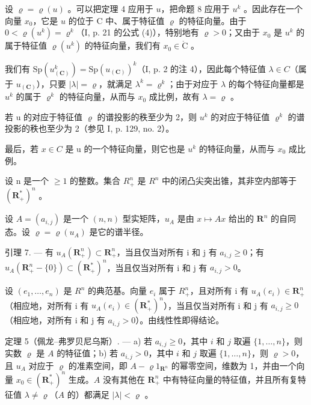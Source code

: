 设 \(\varrho = \varrho(u)\) 。可以把定理 4 应用于 \(u\)，把命题 8 应用于 \(u^k\) 。因此存在一个向量 \(x_0\)，它是 \(u\) 的位于 C 中、属于特征值 \(\varrho\) 的特征向量。由于 \(0 < \varrho(u^k) = \varrho^k\)（I, p. 21 的公式 (4)），特别地有 \(\varrho > 0\)；又由于 \(x_0\) 是 \(u^k\) 的属于特征值 \(\varrho(u^k)\) 的特征向量，我们有 \(x_0 \in \mathring{\mathrm{C}}\) 。

我们有 \(\mathrm{Sp}(u_{(\mathbf{C})}^{k})=\mathrm{Sp}(u_{(\mathbf{C})})^{k}\)（I, p. 2 的注 4），因此每个特征值 \(\lambda\in C\)（属于 \(u_{(\mathbf{C})}\)），只要 \(|\lambda|=\varrho\)，就满足 \(\lambda^{k}=\varrho^{k}\)；由于对应于 \(\lambda\) 的每个特征向量都是 \(u^{k}\) 的属于 \(\varrho^{k}\) 的特征向量，从而与 \(x_{0}\) 成比例，故有 \(\lambda=\varrho\) 。

若 u 的对应于特征值 \(\varrho\) 的谱投影的秩至少为 2，则 \(u^{k}\) 的对应于特征值 \(\varrho^{k}\) 的谱投影的秩也至少为 2（参见 I, p. 129, no. 2）。

最后，若 \(x \in C\) 是 u 的一个特征向量，则它也是 \(u^{k}\) 的特征向量，从而与 \(x_{0}\) 成比例。

设 n 是一个 \(\geqslant 1\) 的整数。集合 \(R_{+}^{n}\) 是 \(R^{n}\) 中的闭凸尖突出锥，其非空内部等于 \((\mathbf{R}_{+}^{*})^{n}\) 。

设 \(A = (a_{i,j})\) 是一个 \((n,n)\) 型实矩阵，\(u_A\) 是由 \(x \mapsto Ax\) 给出的 \(\mathbf{R}^n\) 的自同态。设 \(\varrho = \varrho(u_A)\) 是它的谱半径。

引理 7. --- 有 \(u_A(\mathbf{R}_+^n) \subset \mathbf{R}_+^n\)，当且仅当对所有 i 和 j 有 \(a_{i,j} \geqslant 0\)；有 \(u_A(\mathbf{R}_+^n - \{0\}) \subset (\mathbf{R}_+^*)^n\)，当且仅当对所有 i 和 j 有 \(a_{i,j} > 0\)。

设 \((e_{1},\ldots,e_{n})\) 是 \(R^{n}\) 的典范基。向量 \(e_{i}\) 属于 \(R_{+}^{n}\)，且对所有 i 有 \(u_{A}(e_{i})\in\mathbf{R}_{+}^{n}\)（相应地，对所有 i 有 \(u_{A}(e_{i})\in(\mathbf{R}_{+}^{*})^{n}\)），当且仅当对所有 i 和 j 有 \(a_{i,j}\geqslant0\)（相应地，对所有 i 和 j 有 \(a_{i,j}>0\)）。由线性性即得结论。

定理 5（佩龙–弗罗贝尼乌斯）. --- a) 若 \(a_{i,j} \geqslant 0\)，其中 \(i\) 和 \(j\) 取遍 \(\{1,\ldots,n\}\)，则实数 \(\varrho\) 是 \(A\) 的特征值；b) 若 \(a_{i,j} > 0\)，其中 \(i\) 和 \(j\) 取遍 \(\{1,\ldots,n\}\)，则 \(\varrho > 0\)，且 \(u_A\) 对应于 \(\varrho\) 的准素空间，即 \(A - \varrho 1_{\mathbf{R}^n}\) 的幂零空间，维数为 1，并由一个向量 \(x_0 \in (\mathbf{R}_+^*)^n\) 生成。\(A\) 没有其他在 \(\mathbf{R}_+^n\) 中有特征向量的特征值，并且所有复特征值 \(\lambda \neq \varrho\)（\(A\) 的）都满足 \(|\lambda| < \varrho\) 。


